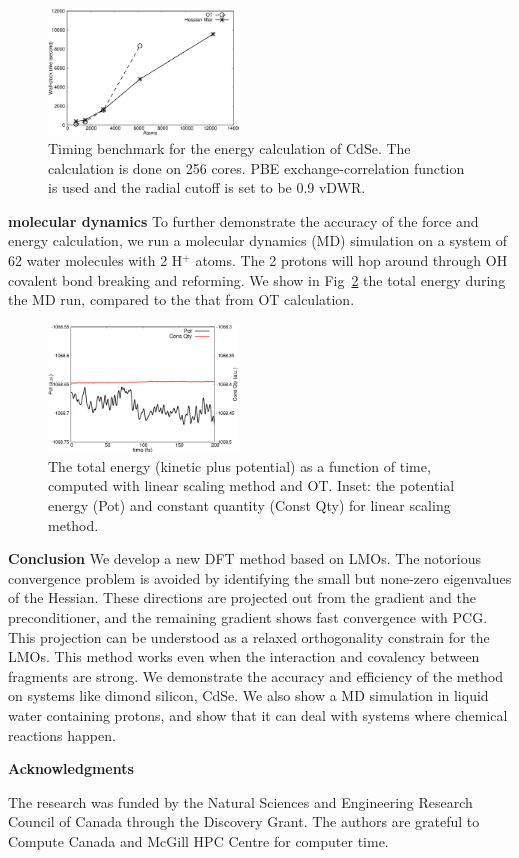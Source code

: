 \documentclass[prl,twocolumn,showpacs]{revtex4}
\begin{document}
\begin{figure}
\includegraphics[width=0.45\textwidth]{timing}
\caption{Timing benchmark for the energy calculation of CdSe. The calculation is done on 256 cores. PBE exchange-correlation function is used and the radial cutoff is set to be 0.9 vDWR.}
\label{fig:scaling}
\end{figure}



\textbf{molecular dynamics}
To further demonstrate the accuracy of the force and energy calculation, we run a molecular dynamics (MD) simulation on a system of 62 water molecules with 2 H$^+$ atoms. The 2 protons will hop around through OH covalent bond breaking and reforming. We show in Fig~\ref{fig:md} the total energy during the MD run, compared to the that from OT calculation. 

\begin{figure}
\includegraphics[width=0.45\textwidth]{const}
\caption{The total energy (kinetic plus potential) as a function of time, computed with linear scaling method and OT. Inset: the potential energy (Pot) and constant quantity (Const Qty) for linear scaling method.}
\label{fig:md}
\end{figure}

\textbf{Conclusion} We develop a new DFT method based on LMOs. The notorious convergence problem is avoided by identifying the small but none-zero eigenvalues of the Hessian. These directions are projected out from the gradient and the preconditioner, and the remaining gradient shows fast convergence with PCG. This projection can be understood as a relaxed orthogonality constrain for the LMOs. This method works even when the interaction and covalency between fragments are strong. We demonstrate the accuracy and efficiency of the method on systems like dimond silicon, CdSe. We also show a MD simulation in liquid water containing protons, and show that it can deal with systems where chemical reactions happen.


\textbf{Acknowledgments} 

The research was funded by the Natural Sciences and Engineering Research Council of Canada through the Discovery Grant. The authors are grateful to Compute Canada and McGill HPC Centre for computer time.


\end{document}

